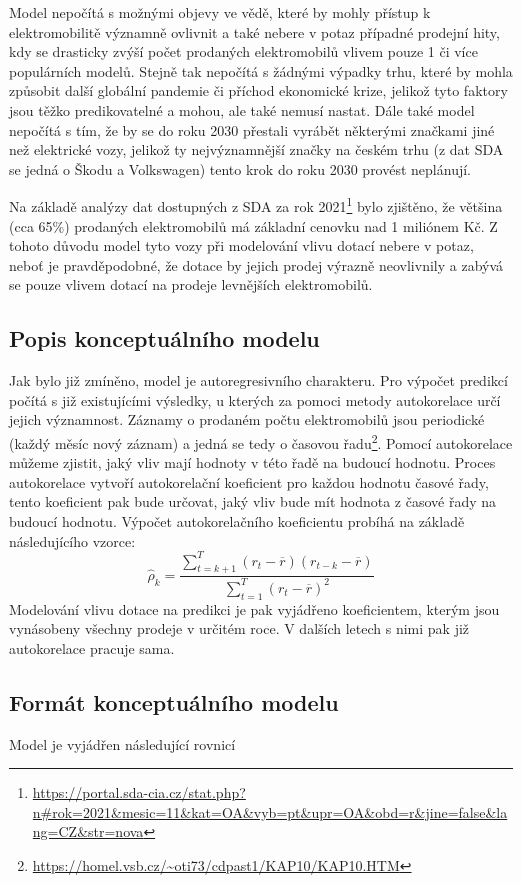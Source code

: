 \documentclass[14pt]{extarticle}
\begin{document}
	Model nepočítá s možnými objevy ve vědě, které by mohly přístup k elektromobilitě významně ovlivnit a také nebere v potaz případné prodejní hity, kdy se drasticky zvýší počet prodaných elektromobilů vlivem pouze 1 či více populárních modelů. Stejně tak nepočítá s žádnými výpadky trhu, které by mohla způsobit další globální pandemie či příchod ekonomické krize, jelikož tyto faktory jsou těžko predikovatelné a mohou, ale také nemusí nastat. Dále také model nepočítá s tím, že by se do roku 2030 přestali vyrábět některými značkami jiné než elektrické vozy, jelikož ty nejvýznamnější značky na českém trhu (z dat SDA se jedná o Škodu a Volkswagen)  tento krok do roku 2030 provést neplánují.
	
	Na základě analýzy dat dostupných z SDA za rok 2021\footnote{\url{https://portal.sda-cia.cz/stat.php?n\#rok=2021\&mesic=11\&kat=OA\&vyb=pt\&upr=OA\&obd=r\&jine=false\&lang=CZ\&str=nova}} bylo zjištěno, že většina (cca 65\%) prodaných elektromobilů má základní cenovku nad 1 miliónem Kč. Z tohoto důvodu model tyto vozy při modelování vlivu dotací nebere v potaz, neboť je pravděpodobné, že dotace by jejich prodej výrazně neovlivnily a zabývá se pouze vlivem dotací na prodeje levnějších elektromobilů.
	
	\subsection{Popis konceptuálního modelu}
	Jak bylo již zmíněno, model je autoregresivního charakteru. Pro výpočet predikcí počítá s již existujícími výsledky, u kterých za pomoci metody autokorelace určí jejich významnost. Záznamy o prodaném počtu elektromobilů jsou periodické (každý měsíc nový záznam) a jedná se tedy o časovou řadu\footnote{\url{https://homel.vsb.cz/~oti73/cdpast1/KAP10/KAP10.HTM}}. Pomocí autokorelace můžeme zjistit, jaký vliv mají hodnoty v této řadě na budoucí hodnotu. Proces autokorelace vytvoří autokorelační koeficient pro každou hodnotu časové řady, tento koeficient pak bude určovat, jaký vliv bude mít hodnota z časové řady na budoucí hodnotu. Výpočet autokorelačního koeficientu probíhá na základě následujícího vzorce: 
	\label{ARM}
	$$
    \hat{\rho}_k = \frac{\sum\limits_{t=k+1}^{T}(r_t - \overline{r})(r_{t-k} - \overline{r})}{\sum\limits_{t=1}^{T}(r_t - \overline{r})^2}
    $$
    Modelování vlivu dotace na predikci je pak vyjádřeno koeficientem, kterým jsou vynásobeny všechny prodeje v určitém roce. V dalších letech s nimi pak již autokorelace pracuje sama.
	
	\subsection{Formát konceptuálního modelu}
	\label{PRED}
	Model je vyjádřen následující rovnicí
\end{document}
